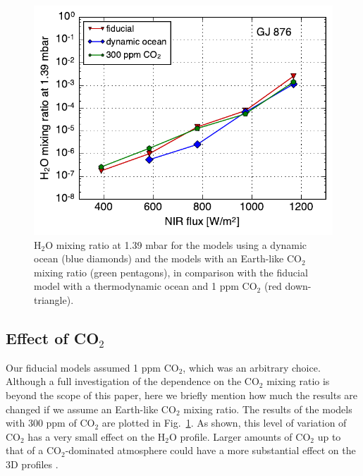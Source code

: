 \documentclass[11pt,numberedappendix,twocolappendix,]{emulateapj}
\def\water{H$_2$O }
\newcommand{\dsa}[1]{{\color{blue}#1}}
\begin{document}
\begin{figure}[!h]
    \begin{center}
    \includegraphics[width=0.9\hsize]{fig/xH2O_sensitivity.pdf}
    \end{center}
\caption{\dsa{\water mixing ratio at 1.39 mbar} for the models \dsa{using a dynamic ocean} (blue diamonds) and the models with \dsa{an} Earth-like CO$_2$ mixing ratio (green pentagons), in comparison with the fiducial model with \dsa{a} thermodynamic ocean and 1 ppm CO$_2$ (red down-triangle). }
\label{fig:change_ocean}
\end{figure}

\subsection{Effect of CO$_2$}
\label{ss:sensitivity_ocean}

Our fiducial models assumed 1 ppm CO$_2$, which was an arbitrary choice. 
Although a full investigation of the dependence on the CO$_2$ mixing ratio is beyond the scope of this paper, here we briefly mention how much the results are changed if we assume an Earth-like CO$_2$ mixing ratio. 
The results of the models with 300 ppm of CO$_2$ are plotted in Fig.~\ref{fig:change_ocean}. 
As shown, this level of variation of CO$_2$ has a very small effect on the \water profile. 
Larger amounts of CO$_2$ up to that \dsa{of a} CO$_2$-dominated atmosphere could have a more substantial effect on the 3D profiles \citep{Wordsworth2013}. 
\end{document}
